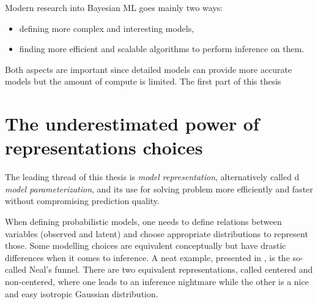 Modern research into Bayesian \ac{ML} goes mainly two ways:
\begin{itemize}
    \item defining more complex and interesting models,
    \item finding more efficient and scalable algorithms to perform inference on them.
\end{itemize}
Both aspects are important since detailed models can provide more accurate models but the amount of compute is limited.
The first part of this thesis 

\section{The underestimated power of representations choices}

The leading thread of this thesis is \textit{model representation}, alternatively called d \textit{model parameterization}, and its use for solving problem more efficiently and faster without compromising prediction quality.

When defining probabilistic models, one needs to define relations between variables (observed and latent) and choose appropriate distributions to represent those.
Some modelling choices are equivalent conceptually but have drastic differences when it comes to inference.
A neat example, presented in \citet{gorinovaAutomaticReparameterisationProbabilistic2020}, is the so-called Neal's funnel.
There are two equivalent representations, called centered and non-centered, where one leads to an inference nightmare while the other is a nice and easy isotropic Gaussian distribution.

